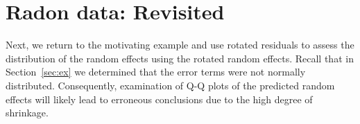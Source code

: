 \documentclass[12pt]{article} %
\begin{document}
%
%
%
%

\section{Radon data: Revisited}\label{sec:radon2}
Next, we return to the motivating example and use rotated residuals to assess the distribution of the random effects using the rotated random effects. 
Recall that in Section~\ref{sec:ex} we determined that the error terms were not normally distributed. Consequently, examination of Q-Q plots of the predicted random effects will likely lead to erroneous conclusions due to the high degree of shrinkage. 
\end{document}
